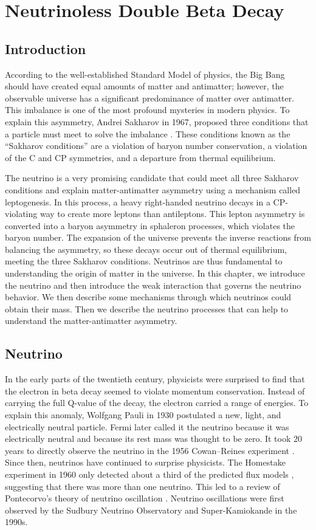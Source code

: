 \chapter{Neutrinoless Double Beta Decay}

\section{Introduction}
According to the well-established Standard Model of physics, the Big Bang should have created equal amounts of matter and antimatter; however, the observable universe has a significant predominance of matter over antimatter. This imbalance is one of the most profound mysteries in modern physics. To explain this asymmetry, Andrei Sakharov in 1967, proposed three conditions that a particle must meet to solve the imbalance \cite{sakharov_1991}. These conditions known as the ``Sakharov conditions'' are a violation of baryon number conservation, a violation of the C and CP symmetries, and a departure from thermal equilibrium.

The neutrino is a very promising candidate that could meet all three Sakharov conditions and explain matter-antimatter asymmetry using a mechanism called leptogenesis. In this process, a heavy right-handed neutrino decays in a CP-violating way to create more leptons than antileptons. This lepton asymmetry is converted into a baryon asymmetry in sphaleron processes, which violates the baryon number. The expansion of the universe prevents the inverse reactions from balancing the asymmetry, so these decays occur out of thermal equilibrium, meeting the three Sakharov conditions. Neutrinos are thus fundamental to understanding the origin of matter in the universe. In this chapter, we introduce the neutrino and then introduce the weak interaction that governs the neutrino behavior. We then describe some mechanisms through which neutrinos could obtain their mass. Then we describe the neutrino processes that can help to understand the matter-antimatter asymmetry.

\section{Neutrino}
In the early parts of the twentieth century, physicists were surprised to find that the electron in beta decay seemed to violate momentum conservation. Instead of carrying the full Q-value of the decay, the electron carried a range of energies. To explain this anomaly, Wolfgang Pauli in 1930 postulated a new, light, and electrically neutral particle. Fermi later called it the neutrino because it was electrically neutral and because its rest mass was thought to be zero. It took 20 years to directly observe the neutrino in the 1956 Cowan–Reines experiment \cite{PhysRev.92.830}. Since then, neutrinos have continued to surprise physicists. The Homestake experiment in 1960 only detected about a third of the predicted flux models \cite{Cleveland:1998nv}, suggesting that there was more than one neutrino. This led to a review of Pontecorvo’s theory of neutrino oscillation \cite{Pontecorvo:1967fh}. Neutrino oscillations were first observed by the Sudbury Neutrino Observatory \cite{SNO:2001kpb} and Super-Kamiokande \cite{Super_Kamiokande_1998kpq} in the 1990s. 


